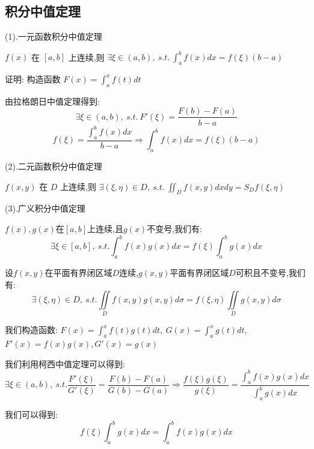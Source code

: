 \subsection{积分中值定理}
\begin{theorem}[积分中值定理]

	(1).一元函数积分中值定理

	$f(x)$ 在 $[a,b]$ 上连续,则 $\exists \xi\in(a,b),\ s.t.\ \int_{a}^{b}f(x)dx=f(\xi)(b-a)$

	证明: 构造函数 $F(x)=\int_{a}^{x}f(t)dt$

	由拉格朗日中值定理得到: $$\exists \xi\in(a,b),\ s.t.\ F'(\xi)=\frac{F(b)-F(a)}{b-a}$$
	$$f(\xi)=\frac{\int_{a}^{b}f(x)dx}{b-a}\Rightarrow \int_{a}^{b}f(x)dx=f(\xi)(b-a)$$

	(2).二元函数积分中值定理

	$f(x,y)$ 在 $D$ 上连续,则 $\exists (\xi,\eta)\in D,\ s.t.\ \iint_{D}f(x,y)dxdy=S_{D}f(\xi,\eta)$

	(3).广义积分中值定理

	$f(x),g(x)$在$[a,b]$上连续,且$g(x)$不变号,我们有:
	$$\exists \xi\in[a,b],\ s.t. \int_{a}^{b}f(x)g(x)dx=f(\xi)\int_{a}^{b}g(x)dx$$

	设$f(x,y)$在平面有界闭区域$D$连续,$g(x,y)$平面有界闭区域$D$可积且不变号,我们有: $$\exists (\xi,\eta)\in D,\ s.t. \iint\limits_{D}f(x,y)g(x,y)d\sigma=f(\xi,\eta)\iint\limits_{D}g(x,y)d\sigma$$
	\begin{anymark}[注]
		我们构造函数: $F(x)=\int_{a}^{x}f(t)g(t)dt,\ G(x)=\int_{a}^{x}g(t)dt$,$F'(x) =f(x)g(x),G'(x) = g(x)$

		我们利用柯西中值定理可以得到:
		$$\exists \xi\in(a,b),\ s.t. \dfrac{F'(\xi)}{G'(\xi)}=\dfrac{F(b)-F(a)}{G(b)-G(a)}\Rightarrow \dfrac{f(\xi)g(\xi)}{g(\xi)}=\dfrac{\int_{a}^{b}f(x)g(x)dx}{\int_{a}^{b}g(x)dx}$$

		我们可以得到: $$f(\xi)\int_{a}^{b}g(x)dx=\int_{a}^{b}f(x)g(x)dx$$
	\end{anymark}
\end{theorem}
